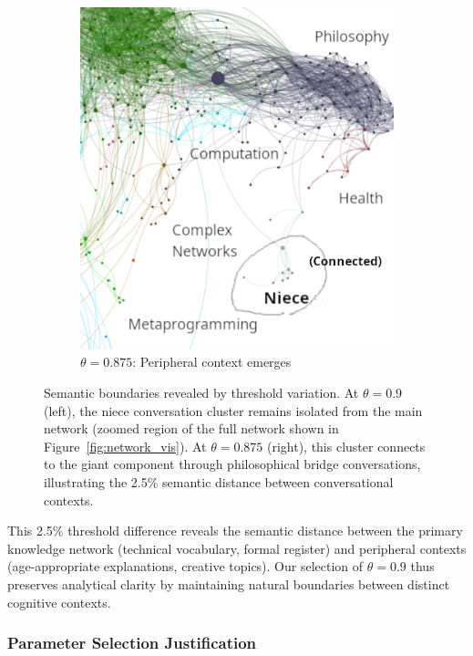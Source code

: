\documentclass{svproc}
\begin{document}
\begin{figure}[h]
\begin{subfigure}{0.48\textwidth}
    \includegraphics[width=\textwidth]{./images/refine/crop-right.png}
    \caption{$\theta=0.875$: Peripheral context emerges}
\end{subfigure}
\caption{Semantic boundaries revealed by threshold variation. At $\theta=0.9$ (left), the niece conversation cluster remains isolated from the main network (zoomed region of the full network shown in Figure~\ref{fig:network_vis}). At $\theta=0.875$ (right), this cluster connects to the giant component through philosophical bridge conversations, illustrating the 2.5\% semantic distance between conversational contexts.}
\label{fig:semantic_boundary}
\end{figure}

This 2.5\% threshold difference reveals the semantic distance between the primary knowledge network (technical vocabulary, formal register) and peripheral contexts (age-appropriate explanations, creative topics). Our selection of $\theta=0.9$ thus preserves analytical clarity by maintaining natural boundaries between distinct cognitive contexts.

\subsubsection{Parameter Selection Justification}
\end{document}
